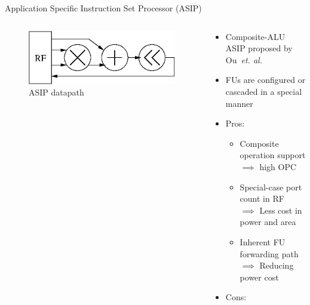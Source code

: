 \documentclass{beamer}
\begin{document}
\begin{CJK}{UTF8}{bkai}
            \begin{frame}{Application Specific Instruction Set Processor (ASIP)}
                \begin{columns}
                    \begin{column}{0.45\textwidth}
                        \begin{figure}[!ht]
                            \centering
                            \includegraphics[width=0.9\linewidth]{./figs/cascade.eps}
                            \caption{ASIP datapath}
                        \end{figure}
                    \end{column}
                    \begin{column}{0.55\textwidth}
                        \begin{itemize}
                            \item <2-> {Composite-ALU ASIP proposed by Ou~\textit{et. al.}~\cite{cascade}}
                            \item <3-> {FUs are configured or cascaded in a special manner}
                            \item <4-> {Pros:
                                \begin{itemize}
                                    \item Composite operation support \\ $\implies$ high OPC
                                    \item Special-case port count in RF \\ $\implies$ Less cost in power and area
                                    \item Inherent FU forwarding path \\ $\implies$ Reducing power cost
                                \end{itemize}
                                }
                            \item <5-> {Cons:
                                \begin{itemize}

\end{itemize}}
\end{itemize}
\end{column}
\end{columns}
\end{frame}
\end{CJK}
\end{document}
